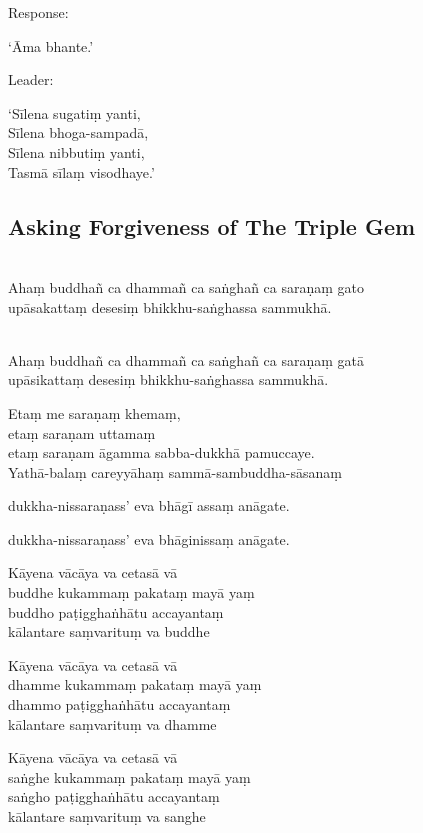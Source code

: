 \ifhandbookedition
\enlargethispage{\baselineskip}
\fi

\begin{instruction}
  Response:
\end{instruction}

‘Āma bhante.’

\begin{instruction}
  Leader:
\end{instruction}

‘Sīlena sugatiṃ yanti,\\
Sīlena bhoga-sampadā,\\
Sīlena nibbutiṃ yanti,\\
Tasmā sīlaṃ visodhaye.’

\subsection{Asking Forgiveness of The Triple Gem}

\\\relax
Ahaṃ buddhañ ca dhammañ ca saṅghañ ca saraṇaṃ gato\\
upāsakattaṃ desesiṃ bhikkhu-saṅghassa sammukhā.

\\\relax
Ahaṃ buddhañ ca dhammañ ca saṅghañ ca saraṇaṃ gatā\\
upāsikattaṃ desesiṃ bhikkhu-saṅghassa sammukhā.

Etaṃ me saraṇaṃ khemaṃ,\\
etaṃ saraṇam uttamaṃ\\
etaṃ saraṇam āgamma sabba-dukkhā pamuccaye.\\
Yathā-balaṃ careyyāhaṃ sammā-sambuddha-sāsanaṃ

%
dukkha-nissaraṇass' eva bhāgī assaṃ anāgate.

%
dukkha-nissaraṇass' eva bhāginissaṃ anāgate.

Kāyena vācāya va cetasā vā\\
buddhe kukammaṃ pakataṃ mayā yaṃ\\
buddho paṭigghaṅhātu accayantaṃ\\
kālantare saṃvarituṃ va buddhe

Kāyena vācāya va cetasā vā\\
dhamme kukammaṃ pakataṃ mayā yaṃ\\
dhammo paṭigghaṅhātu accayantaṃ\\
kālantare saṃvarituṃ va dhamme

Kāyena vācāya va cetasā vā\\
saṅghe kukammaṃ pakataṃ mayā yaṃ\\
saṅgho paṭigghaṅhātu accayantaṃ\\
kālantare saṃvarituṃ va sanghe

